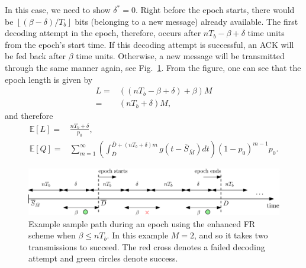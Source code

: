 \documentclass[12pt,journal,onecolumn]{IEEEtran}
\begin{document}
In this case, we need to show $\delta^*=0$. Right before the epoch starts, there would be $\left\lfloor(\beta-\delta)/T_b\right\rfloor$ bits (belonging to a new message) already available. The first decoding attempt in the epoch, therefore, occurs after $nT_b-\beta+\delta$ time units from the epoch's start time. If this decoding attempt is successful, an ACK will be fed back after $\beta$ time units. Otherwise, a new message will be transmitted through the same manner again, see Fig.~\ref{fig_fr_enhanced_beta}. From the figure, one can see that the epoch length is given by
\begin{align}
L=&\left(\left(nT_b-\beta+\delta\right)+\beta\right)M \\
=&\left(nT_b+\delta\right)M,
\end{align}
and therefore
\begin{align}
\mathbb{E}[L]=&\frac{nT_b+\delta}{p_0}, \label{eq_exp_L_fr_enhanced_beta} \\
\mathbb{E}[Q]=&\sum_{m=1}^\infty\left(\int_{\overline{D}}^{\overline{D}+\left(nT_b+\delta\right)m}g\left(t-\overline{S}_{\bar{M}}\right)dt\right)(1-p_0)^{m-1}p_0. \label{eq_exp_Q_fr_enhanced_beta}
\end{align}

\begin{figure}
\center
\includegraphics[scale=.5]{fr_enhanced_beta}
\caption{Example sample path during an epoch using the enhanced FR scheme when $\beta\leq nT_b$. In this example $M=2$, and so it takes two transmissions to succeed. The red cross denotes a failed decoding attempt and green circles denote success.}
\label{fig_fr_enhanced_beta}
\end{figure}
\end{document}
